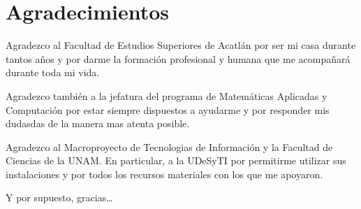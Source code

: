 \chapter*{Agradecimientos}

{\small
Agradezco al Facultad de Estudios Superiores de Acatlán por ser mi casa durante tantos años y por darme la formación profesional y humana que me acompañará durante toda mi vida.

Agradezco también a la jefatura del programa de Matemáticas Aplicadas y Computación por estar siempre dispuestos a ayudarme y por responder mis dudasdas de la manera mas atenta posible.

Agradezco al Macroproyecto de Tecnologias de Información y la Facultad de Ciencias de la UNAM. En particular, a la UDeSyTI por permitirme utilizar sus instalaciones y por todos los recursos materiales con los que me apoyaron.

Y por supuesto, gracias\ldots

}
